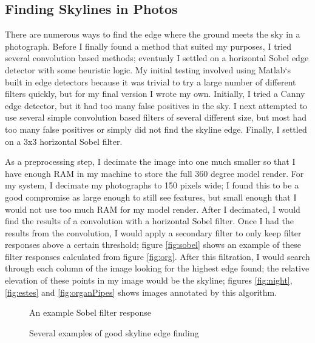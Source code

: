 \documentclass{acm_proc_article-sp}
\begin{document}
\subsection{Finding Skylines in Photos}
    There are numerous ways to find the edge where the ground meets the sky in a photograph.  Before I finally found a method that suited my purposes, I tried several convolution based methods; eventualy I settled on a horizontal Sobel edge detector with some heuristic logic.  My initial testing involved using Matlab`s built in edge detectors \cite{mcandrew2004introduction} because it was trivial to try a large number of different filters quickly, but for my final version I wrote my own.  Initially, I tried a Canny edge detector, but it had too many false positives in the sky.  I next attempted to use several simple convolution \cite{Schafer:DSP} based filters of several different size, but most had too many false positives or simply did not find the skyline edge.  Finally, I settled on a 3x3 horizontal Sobel filter. \cite{behringer2002registration}  

As a preprocessing step, I decimate the image into one much smaller so that I have enough RAM in my machine to store the full 360 degree model render.  For my system, I decimate my photographs to 150 pixels wide; I found this to be a good compromise as large enough to still see features, but small enough that I would not use too much RAM for my model render. After I decimated, I would find the results of a convolution with a horizontal Sobel filter. Once I had the results from the convolution, I would apply a secondary filter to only keep filter responses above a certain threshold; figure \ref{fig:sobel} shows an example of these filter responses calculated from figure \ref{fig:org}.  After this filtration, I would search through each column of the image looking for the highest edge found; the relative elevation of these points in my image would be the skyline; figures \ref{fig:night}, \ref{fig:estes} and \ref{fig:organPipes} shows images annotated by this algorithm. 
\begin{figure*}
	\centering
	\caption{An example Sobel filter response}
\end{figure*}
\begin{figure*}
	\label{figs:annot}
	\centering
	\caption{Several examples of good skyline edge finding}
\end{figure*}
\end{document}
